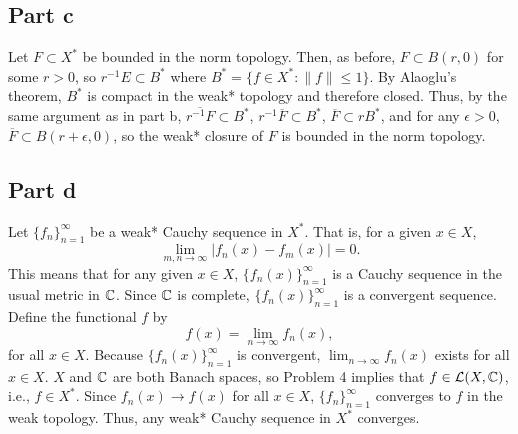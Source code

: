 \documentclass{article}
\begin{document}
\subsection{Part c}
Let $F\subset X^*$ be bounded in the norm topology. Then, as before, $F\subset B(r,0)$ for some $r>0$, so $r^{-1}E\subset B^*$ where $B^*=\{f\in X^*:\|f\|\leq 1\}$. By Alaoglu's theorem, $B^*$ is compact in the weak* topology and therefore closed. Thus, by the same argument as in part b, $\overline{r^{-1}F}\subset B^*$, $r^{-1}\overline F\subset B^*$, $\overline{F}\subset rB^*$, and for any $\epsilon>0$, $\overline{F}\subset B(r+\epsilon,0)$, so the weak* closure of $F$ is bounded in the norm topology.

\subsection{Part d}
Let $\{f_n\}_{n=1}^\infty$ be a weak* Cauchy sequence in $X^*$. That is, for a given $x\in X$, 
\[
\lim_{m,n\to\infty}|f_n(x)-f_m(x)|=0.
\]
This means that for any given $x\in X$, $\{f_n(x)\}_{n=1}^\infty$ is a Cauchy sequence in the usual metric in $\mathbb{C}$. Since $\mathbb{C}$ is complete, $\{f_n(x)\}_{n=1}^\infty$ is a convergent sequence. Define the functional $f$ by
\[
f(x)=\lim_{n\to\infty}f_n(x),
\]
for all $x\in X$. Because $\{f_n(x)\}_{n=1}^\infty$ is convergent, $\lim_{n\to\infty}f_n(x)$ exists for all $x\in X$. $X$ and $\mathbb{C}$ are both Banach spaces, so Problem 4 implies that $f\in{\cal L}(X,\mathbb{C})$, i.e., $f\in X^*$. Since $f_n(x)\to f(x)$ for all $x\in X$, $\{f_n\}_{n=1}^\infty$ converges to $f$ in the weak topology. Thus, any weak* Cauchy sequence in $X^*$ converges.
\end{document}
